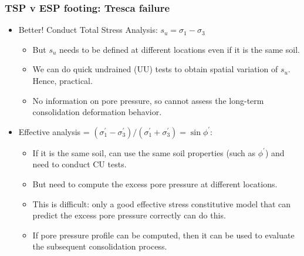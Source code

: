 \documentclass[notes]{beamer}
\begin{document}
\begin{frame}
\frametitle{TSP v ESP footing: Tresca failure}
\begin{itemize}
	\item Better! Conduct Total Stress Analysis: $s_u = \sigma_1 - \sigma_3$
	\begin{itemize}
		\item But $s_u$ needs to be defined at different locations even if it is the same
		soil.
		\item We can do quick undrained (UU) tests to obtain spatial variation of
		$s_u$. Hence, practical.
		\item No information on pore pressure, so cannot assess the long-term consolidation deformation behavior.
	\end{itemize}
	\item Effective analysis = $(\sigma_1^\prime - \sigma_3^\prime)/(\sigma_1^\prime + \sigma_3^\prime) = \sin \phi^\prime$:
	\begin{itemize}
		\item If it is the same soil, can use the same soil properties (such as $\phi^\prime$)
		and need to conduct CU tests.
		\item But need to compute the excess pore pressure at different locations.
		\item This is difficult: only a good effective stress constitutive model that
		can predict the excess pore pressure correctly can do this.
		\item If pore pressure profile can be computed, then it can be used to
		evaluate the subsequent consolidation process.
	\end{itemize}
\end{itemize}
\end{frame}
\end{document}
